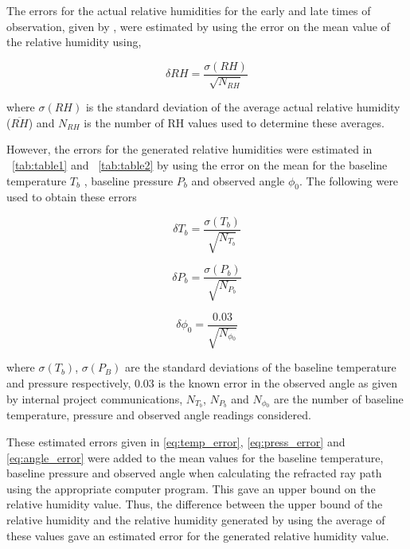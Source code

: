 \documentclass{article}
\newcommand{\tabref}[2][\tablename~]{#1\ref{#2}}
\begin{document}
\vspace{2mm}
\noindent
The errors for the actual relative humidities for the early and late times of observation, given by \cite{Web01}, were estimated by using the error on the mean value of the relative humidity using,


\begin{equation}
\label{eq:RH_error}
\delta{RH} = \frac{\sigma{(RH)}}{\sqrt{N_{RH}}}
\end{equation}

\vspace{2mm}
\noindent
where $\sigma{(RH)}$ is the standard deviation of the average actual relative humidity ($\overline{RH}$) and $N_{RH}$ is the number of RH values used to determine these averages.

\vspace{2mm}
\noindent
However, the errors for the generated relative humidities were estimated in \tabref{tab:table1} and \tabref{tab:table2} by using the error on the mean for the baseline temperature $T_b$ \cite{Web01}, baseline pressure $P_b$ \cite{Web01} and observed angle $\phi_0$. The following were used to obtain these errors

\begin{equation}
\label{eq:temp_error}
\delta{T_b} = \frac{\sigma{(T_b)}}{\sqrt{N_{T{_b}}}}
\end{equation}


\begin{equation}
\label{eq:press_error}
\delta{P_b} = \frac{\sigma{(P_b)}}{\sqrt{N_{P{_b}}}}
\end{equation}

\begin{equation}
\label{eq:angle_error}
\delta{\phi_0} = \frac{0.03}{\sqrt{N_{\phi{_0}}}}
\end{equation}

\vspace{2mm}
\noindent
where $\sigma{(T_b)}$, $\sigma{(P_B)}$ are the standard deviations of the baseline temperature and pressure respectively, 0.03 is the known error in the observed angle as given by internal project communications, $N_{T{_b}}$, $N_{P{_b}}$ and $N_{\phi{_0}}$ are the number of baseline temperature, pressure and observed angle readings considered. 

\vspace{2mm}
\noindent
These estimated errors given in \eqref{eq:temp_error}, \eqref{eq:press_error} and \eqref{eq:angle_error} were added to the mean values for the baseline temperature, baseline pressure and observed angle when calculating the refracted ray path using the appropriate computer program. This gave an upper bound on the relative humidity value. Thus, the difference between the upper bound of the relative humidity and the relative humidity generated by using the average of these values gave an estimated error for the generated relative humidity value.
\end{document}
